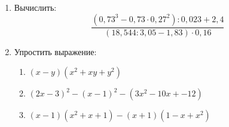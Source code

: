 \documentclass[12pt, a4paper]{article}
\begin{document}
	
	\begin{enumerate}
		\item Вычислить:
		\[ \dfrac{(0,73^3-0,73\cdot0,27^2):0,023+2,4}{(18,544:3,05-1,83)\cdot0,16} \]
		\item Упростить выражение:
		\begin{enumerate}
			\item \( (x-y)(x^2+xy+y^2) \)
			\item \( (2x-3)^2-(x-1)^2-(3x^2-10x+-12) \)
			\item \( (x-1)(x^2+x+1)-(x+1)(1-x+x^2) \)
		\end{enumerate}
	\end{enumerate}
\end{document}
